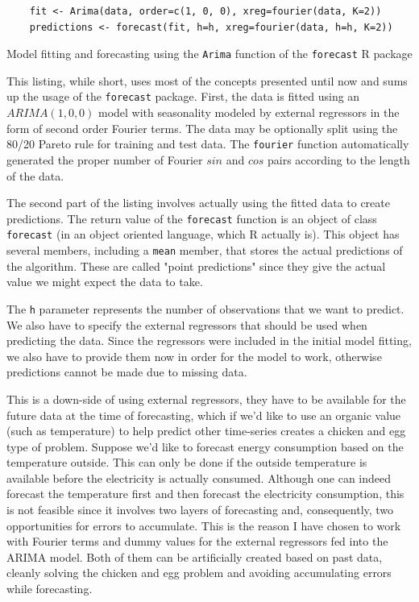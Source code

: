 \documentclass[12pt,a4paper,titlepage]{report}
\begin{document}
\begin{listing}[h]
    \begin{verbatim}
    fit <- Arima(data, order=c(1, 0, 0), xreg=fourier(data, K=2))
    predictions <- forecast(fit, h=h, xreg=fourier(data, h=h, K=2))
    \end{verbatim}
    
    \caption{Model fitting and forecasting using the \texttt{Arima} function of the \texttt{forecast} R package}
    \label{examplearimacode}
\end{listing}

This listing, while short, uses most of the concepts presented until now and sums up the usage of the \texttt{forecast} package.
First, the data is fitted using an $ ARIMA(1, 0, 0) $ model with seasonality modeled by external regressors in the form of second order Fourier terms. The data may be optionally split using the 80/20 Pareto rule for training and test data. The \texttt{fourier} function automatically generated the proper number of Fourier $ sin $ and $ cos $ pairs according to the length of the data.

The second part of the listing involves actually using the fitted data to create predictions. The return value of the \texttt{forecast} function is an object of class \texttt{forecast} (in an object oriented language, which R actually is). This object has several members, including a \texttt{mean} member, that stores the actual predictions of the algorithm. These are called "point predictions" since they give the actual value we might expect the data to take.

The \texttt{h} parameter represents the number of observations that we want to predict. We also have to specify the external regressors that should be used when predicting the data. Since the regressors were included in the initial model fitting, we also have to provide them now in order for the model to work, otherwise predictions cannot be made due to missing data.

This is a down-side of using external regressors, they have to be available for the future data at the time of forecasting, which if we'd like to use an organic value (such as temperature) to help predict other time-series creates a chicken and egg type of problem. Suppose we'd like to forecast energy consumption based on the temperature outside. This can only be done if the outside temperature is available before the electricity is actually consumed. Although one can indeed forecast the temperature first and then forecast the electricity consumption, this is not feasible since it involves two layers of forecasting and, consequently, two opportunities for errors to accumulate. This is the reason I have chosen to work with Fourier terms and dummy values for the external regressors fed into the ARIMA model. Both of them can be artificially created based on past data, cleanly solving the chicken and egg problem and avoiding accumulating errors while forecasting.
\end{document}
